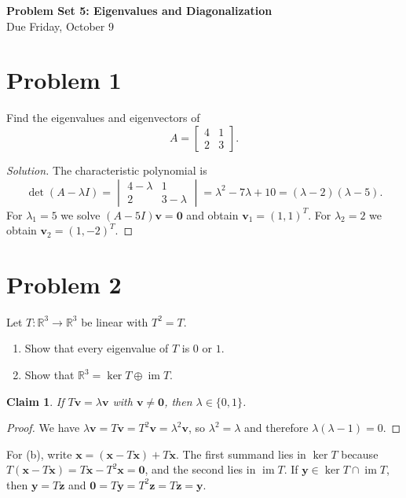 \documentclass[12pt]{article}
\newtheorem*{claim}{Claim}
\newcommand{\R}{\mathbb{R}}
\begin{document}
\begin{center}
  {\Large\bfseries Problem Set 5: Eigenvalues and Diagonalization}\\[4pt]
  Due Friday, October 9
\end{center}

\section*{Problem 1}
Find the eigenvalues and eigenvectors of
\[
A = \begin{bmatrix} 4 & 1 \\ 2 & 3 \end{bmatrix}.
\]

\begin{proof}[Solution]
The characteristic polynomial is
\[
\det(A - \lambda I) = \begin{vmatrix} 4-\lambda & 1 \\ 2 & 3-\lambda \end{vmatrix}
 = \lambda^2 - 7\lambda + 10 = (\lambda-2)(\lambda-5).
\]
For $\lambda_1 = 5$ we solve $(A-5I)\mathbf{v}=\mathbf{0}$ and obtain
$\mathbf{v}_1 = (1,1)^T$. For $\lambda_2 = 2$ we obtain $\mathbf{v}_2 = (1,-2)^T$.
\end{proof}

\section*{Problem 2}
Let $T\colon \R^3 \to \R^3$ be linear with $T^2 = T$.
\begin{enumerate}[label=(\alph*)]
  \item Show that every eigenvalue of $T$ is $0$ or $1$.
  \item Show that $\R^3 = \ker T \oplus \operatorname{im} T$.
\end{enumerate}

\begin{claim}
If $T\mathbf{v} = \lambda\mathbf{v}$ with $\mathbf{v}\neq\mathbf{0}$, then $\lambda\in\{0,1\}$.
\end{claim}
\begin{proof}
We have $\lambda\mathbf{v} = T\mathbf{v} = T^2\mathbf{v} = \lambda^2\mathbf{v}$, so
$\lambda^2 = \lambda$ and therefore $\lambda(\lambda-1)=0$.
\end{proof}

For (b), write $\mathbf{x} = (\mathbf{x} - T\mathbf{x}) + T\mathbf{x}$. The first
summand lies in $\ker T$ because $T(\mathbf{x}-T\mathbf{x}) = T\mathbf{x}-T^2\mathbf{x}=\mathbf{0}$,
and the second lies in $\operatorname{im} T$. If $\mathbf{y}\in\ker T\cap\operatorname{im}T$,
then $\mathbf{y}=T\mathbf{z}$ and $\mathbf{0}=T\mathbf{y}=T^2\mathbf{z}=T\mathbf{z}=\mathbf{y}$.
\end{document}
